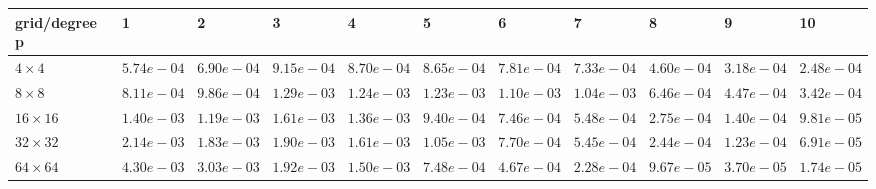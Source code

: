 \begin{tabular}{lllllllllll}
\hline
 grid/degree p   & 1          & 2          & 3          & 4          & 5          & 6          & 7          & 8          & 9          & 10         \\
\hline
 $4 \times 4$    & $5.74e-04$ & $6.90e-04$ & $9.15e-04$ & $8.70e-04$ & $8.65e-04$ & $7.81e-04$ & $7.33e-04$ & $4.60e-04$ & $3.18e-04$ & $2.48e-04$ \\
 $8 \times 8$    & $8.11e-04$ & $9.86e-04$ & $1.29e-03$ & $1.24e-03$ & $1.23e-03$ & $1.10e-03$ & $1.04e-03$ & $6.46e-04$ & $4.47e-04$ & $3.42e-04$ \\
 $16 \times 16$  & $1.40e-03$ & $1.19e-03$ & $1.61e-03$ & $1.36e-03$ & $9.40e-04$ & $7.46e-04$ & $5.48e-04$ & $2.75e-04$ & $1.40e-04$ & $9.81e-05$ \\
 $32 \times 32$  & $2.14e-03$ & $1.83e-03$ & $1.90e-03$ & $1.61e-03$ & $1.05e-03$ & $7.70e-04$ & $5.45e-04$ & $2.44e-04$ & $1.23e-04$ & $6.91e-05$ \\
 $64 \times 64$  & $4.30e-03$ & $3.03e-03$ & $1.92e-03$ & $1.50e-03$ & $7.48e-04$ & $4.67e-04$ & $2.28e-04$ & $9.67e-05$ & $3.70e-05$ & $1.74e-05$ \\
\hline
\end{tabular}